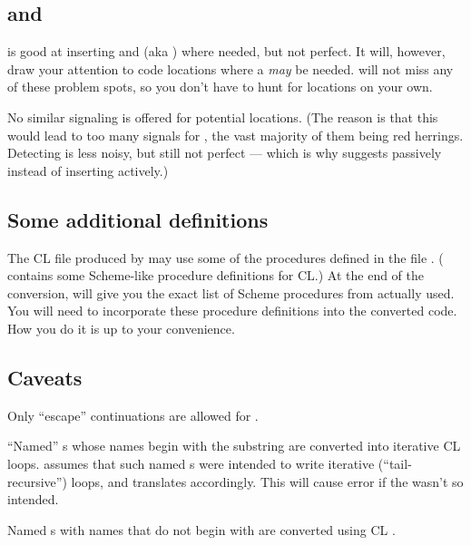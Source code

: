 \subsection{ and }

 is good at inserting  and 
(aka ) where needed, but not perfect.  It will,
however, draw your attention to code locations where a
 {\it may\/} be needed.   will not
miss any of these problem spots, so you don't have to hunt
for  locations on your own.

No similar signaling is offered for potential
 locations.
(The reason is that this would lead to too many signals for
, the vast majority of them being red herrings.
Detecting  is less noisy, but still not perfect
--- which is why  suggests passively instead of
inserting actively.)

\subsection{Some additional definitions}

The CL file produced by  may use some of the
procedures defined in the file
.  (  contains some Scheme-like
procedure definitions for CL.)  At the end of the
conversion,  will give you the exact list of
Scheme procedures from
 actually used.  You will need to
incorporate these procedure definitions into the
converted code.  How you do it is up to your
convenience.

\subsection{Caveats}

Only ``escape'' continuations are allowed for
.

``Named'' s whose names begin with the substring
 are converted into iterative CL loops.
 assumes that such named s were intended to
write iterative (``tail-recursive'') loops, and translates
accordingly.  This will cause error if the  wasn't so
intended.

Named s with names that do not begin with 
are converted using CL .

%
%
%
%

\bye
